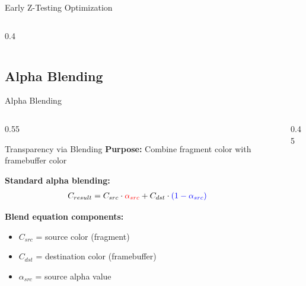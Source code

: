 \begin{frame}{Early Z-Testing Optimization}
\begin{columns}
\begin{column}{0.4\textwidth}
    \end{column}
  \end{columns}
\end{frame}

\subsection{Alpha Blending}
\begin{frame}{Alpha Blending}
  \footnotesize
  \begin{columns}
    \begin{column}{0.55\textwidth}
      \begin{raybox}{Transparency via Blending}
        \textbf{Purpose:} Combine fragment color with framebuffer color

        \vspace{0.3cm}
        \textbf{Standard alpha blending:}
        \begin{align*}
          C_{result} &= C_{src} \cdot \textcolor{red}{\alpha_{src}} + C_{dst} \cdot \textcolor{blue}{ (1 - \alpha_{src})}
        \end{align*}

        \vspace{0.3cm}
        \textbf{Blend equation components:}
        \begin{itemize}
          \item $C_{src}$ = source color (fragment)
          \item $C_{dst}$ = destination color (framebuffer)
          \item $\alpha_{src}$ = source alpha value
        \end{itemize}
      \end{raybox}
    \end{column}
    \begin{column}{0.45\textwidth}
      \begin{center}
\end{center}
\end{column}
\end{columns}
\end{frame}
